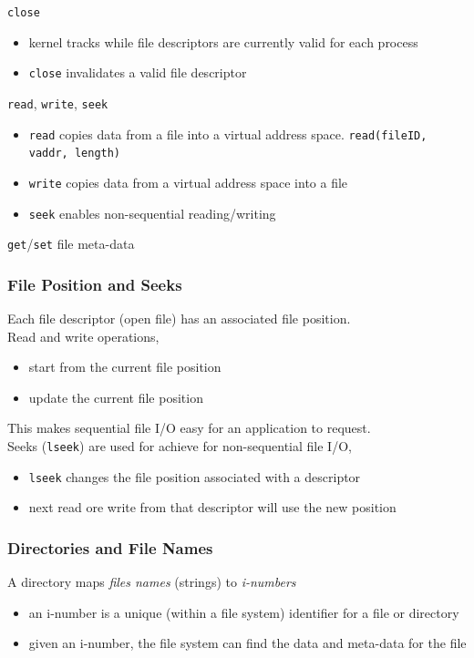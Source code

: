 \documentclass[12pt]{article}
\theoremstyle{plain}
\theoremstyle{definition}
\begin{document}
\texttt{close}
\begin{itemize}
  \item kernel tracks while file descriptors are currently valid for each process
  \item \texttt{close} invalidates a valid file descriptor
\end{itemize}

\texttt{read}, \texttt{write}, \texttt{seek}
\begin{itemize}
  \item \texttt{read} copies data from a file into a virtual address space. \texttt{read(fileID, vaddr, length)}
  \item \texttt{write} copies data from a virtual address space into a file
  \item \texttt{seek} enables non-sequential reading/writing
\end{itemize}

\texttt{get}/\texttt{set} file meta-data

\subsubsection{File Position and Seeks}
Each file descriptor (open file) has an associated file position. \\

Read and write operations,
\begin{itemize}
  \item start from the current file position
  \item update the current file position
\end{itemize}

This makes sequential file I/O easy for an application to request. \\

Seeks (\texttt{lseek}) are used for achieve for non-sequential file I/O,
\begin{itemize}
  \item \texttt{lseek} changes the file position associated with a descriptor
  \item next read ore write from that descriptor will use the new position
\end{itemize}

\subsubsection{Directories and File Names}
A directory maps \emph{files names} (strings) to \emph{i-numbers}
\begin{itemize}
  \item an i-number is a unique (within a file system) identifier for a file or directory
  \item given an i-number, the file system can find the data and meta-data for the file
\end{itemize}
\end{document}
